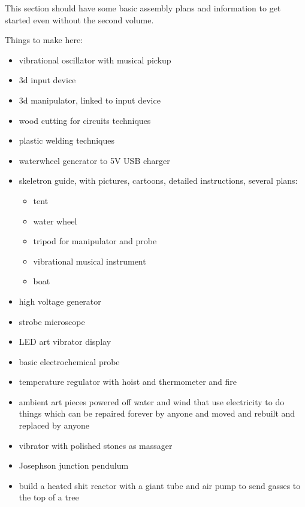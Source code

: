 This section should have some basic assembly plans and information to
get started even without the second volume.

Things to make here:

\begin{itemize}
\tightlist
\item
  vibrational oscillator with musical pickup
\item
  3d input device
\item
  3d manipulator, linked to input device
\item
  wood cutting for circuits techniques
\item
  plastic welding techniques
\item
  waterwheel generator to 5V USB charger
\item
  skeletron guide, with pictures, cartoons, detailed instructions,
  several plans:

  \begin{itemize}
  \tightlist
  \item
    tent
  \item
    water wheel
  \item
    tripod for manipulator and probe
  \item
    vibrational musical instrument
  \item
    boat
  \end{itemize}
\item
  high voltage generator
\item
  strobe microscope
\item
  LED art vibrator display
\item
  basic electrochemical probe
\item
  temperature regulator with hoist and thermometer and fire
\item
  ambient art pieces powered off water and wind that use electricity to
  do things which can be repaired forever by anyone and moved and
  rebuilt and replaced by anyone
\item
  vibrator with polished stones as massager
\item
  Josephson junction pendulum
\item
  build a heated shit reactor with a giant tube and air pump to send
  gasses to the top of a tree
\end{itemize}
